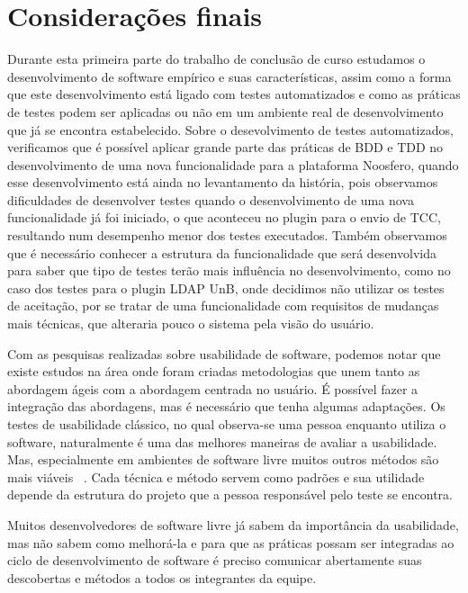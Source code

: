 \chapter{Considerações finais}
\label{consideracoes-finais}

Durante esta primeira parte do trabalho de conclusão de curso estudamos o desenvolvimento de software empírico e suas características, assim como a forma que este desenvolvimento está ligado com testes automatizados e como as práticas de testes podem ser aplicadas ou não em um ambiente real de desenvolvimento que já se encontra estabelecido. Sobre o desevolvimento de testes automatizados, verificamos que é possível aplicar grande parte das práticas de BDD e TDD no desenvolvimento de uma nova funcionalidade para a plataforma Noosfero, quando esse desenvolvimento está ainda no levantamento da história, pois observamos dificuldades de desenvolver testes quando o desenvolvimento de uma nova funcionalidade já foi iniciado, o que aconteceu no plugin para o envio de TCC, resultando num desempenho menor dos testes executados. Também observamos que é necessário conhecer a estrutura da funcionalidade que será desenvolvida para saber que tipo de testes terão mais influência no desenvolvimento, como no caso dos testes para o plugin LDAP UnB, onde decidimos não utilizar os testes de aceitação, por se tratar de uma funcionalidade com requisitos de mudanças mais técnicas, que alteraria pouco o sistema pela visão do usuário.

Com as pesquisas realizadas sobre usabilidade de software, podemos notar que existe estudos na área onde foram criadas metodologias que unem tanto as abordagem ágeis com a abordagem centrada no usuário. É possível fazer a integração das abordagens, mas é necessário que tenha algumas adaptações.
%
Os testes de usabilidade clássico, no qual observa-se uma pessoa enquanto utiliza o software, naturalmente é uma das melhores maneiras de avaliar a usabilidade. Mas, especialmente em ambientes de software livre muitos outros métodos são mais viáveis ~\cite{borchardt2011}. Cada técnica e método servem como padrões e sua utilidade depende da estrutura do projeto que a pessoa responsável pelo teste se encontra. 

Muitos desenvolvedores de software livre já sabem da importância da usabilidade, mas não sabem como melhorá-la e para que as práticas possam ser integradas ao ciclo de desenvolvimento de software é preciso comunicar abertamente suas descobertas e métodos a todos os integrantes da equipe.

